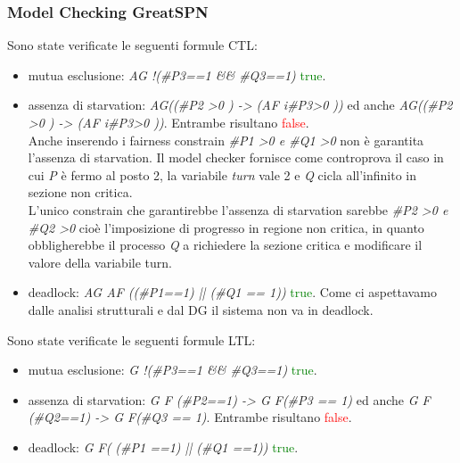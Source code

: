 \documentclass[a4paper]{article}
\begin{document}
\subsubsection{Model Checking GreatSPN}
Sono state verificate le seguenti formule CTL:
\begin{itemize}
	\item mutua esclusione: \textit{AG !(\#P3==1 \&\& \#Q3==1)} \textcolor{green}{true}.
	\item assenza di starvation: \textit{AG((\#P2 >0 ) -> (AF i\#P3>0 ))} ed anche \textit{AG((\#P2 >0 ) -> (AF i\#P3>0 ))}. Entrambe risultano \textcolor{red}{false}.\\
		Anche inserendo i fairness constrain \textit{\#P1 >0 \textit{e} \#Q1 >0} non è garantita l'assenza di starvation. Il model checker fornisce come controprova il caso in cui \textit{P} è fermo al posto 2, la variabile \textit{turn} vale 2 e \textit{Q} cicla all'infinito in sezione non critica.\\
		L'unico constrain che garantirebbe l'assenza di starvation sarebbe \textit{\#P2 >0 \textit{e} \#Q2 >0} cioè l'imposizione di progresso in regione non critica, in quanto obbligherebbe il processo \textit{Q} a richiedere la sezione critica e modificare il valore della variabile turn.
	\item deadlock: \textit{AG AF ((\#P1==1) || (\#Q1 == 1))} \textcolor{green}{true}. Come ci aspettavamo dalle analisi strutturali e dal DG il sistema non va in deadlock.
\end{itemize}
Sono state verificate le seguenti formule LTL:
\begin{itemize}
	\item mutua esclusione: \textit{G !(\#P3==1 \&\& \#Q3==1)} \textcolor{green}{true}.
	\item assenza di starvation: \textit{G F (\#P2==1) -> G F(\#P3 == 1)} ed anche \textit{G F (\#Q2==1) -> G F(\#Q3 == 1)}. Entrambe risultano \textcolor{red}{false}.
	\item deadlock: \textit{G F( (\#P1 ==1) ||  (\#Q1 ==1))} \textcolor{green}{true}.
\end{itemize}
\end{document}
